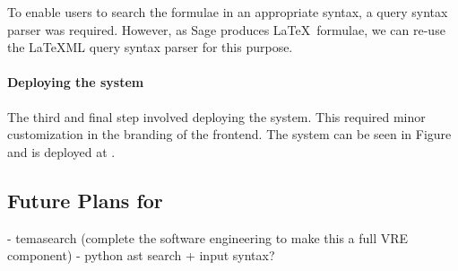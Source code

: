 To enable users to search the formulae in an appropriate syntax, a query syntax parser was required. 
However, as Sage produces \LaTeX\ formulae, we can re-use the {\LaTeX}ML query syntax parser for this purpose. 

\paragraph{Deploying the system}

The third and final step involved deploying the system.
This required minor customization in the branding of the frontend. 
The system can be seen in Figure and is deployed at .


\begin{oldpart}{}
\subsection{Future Plans for \MWS}

- temasearch (complete the software engineering to make this a full  VRE component)
- python ast search + input syntax?
\end{oldpart}


